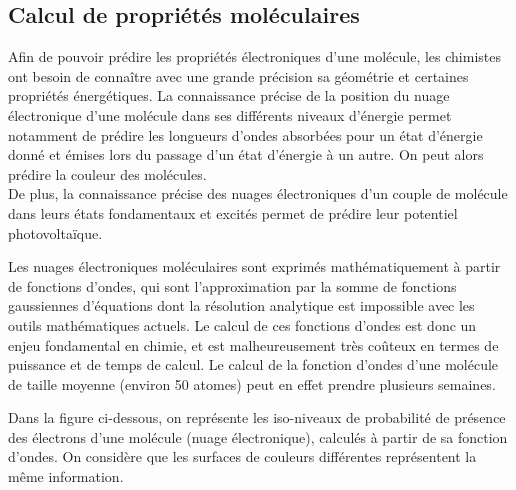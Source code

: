 \subsection{Calcul de propriétés moléculaires}

\par Afin de pouvoir prédire les propriétés électroniques d'une molécule, les chimistes ont besoin de connaître avec une grande précision sa géométrie et certaines propriétés énergétiques. La connaissance précise de la position du nuage électronique d'une molécule dans ses différents niveaux d'énergie permet notamment de prédire les longueurs d'ondes absorbées pour un état d'énergie donné et émises lors du passage d'un état d'énergie à un autre. On peut alors prédire la couleur des molécules. \\
De plus, la connaissance précise des nuages électroniques d'un couple de molécule dans leurs états fondamentaux et excités permet de prédire leur potentiel photovoltaïque. \\

\par Les nuages électroniques moléculaires sont exprimés mathématiquement à partir de fonctions d'ondes, qui sont l'approximation par la somme de fonctions gaussiennes d'équations dont la résolution analytique est impossible avec les outils mathématiques actuels. Le calcul de ces fonctions d'ondes est donc un enjeu fondamental en chimie, et est malheureusement très coûteux en termes de puissance et de temps de calcul. Le calcul de la fonction d'ondes d'une molécule de taille moyenne (environ 50 atomes) peut en effet prendre plusieurs semaines. \\

\par Dans la figure ci-dessous, on représente les iso-niveaux de probabilité de présence des électrons d'une molécule (nuage électronique), calculés à partir de sa fonction d'ondes. On considère que les surfaces de couleurs différentes représentent la même information.\\ 

